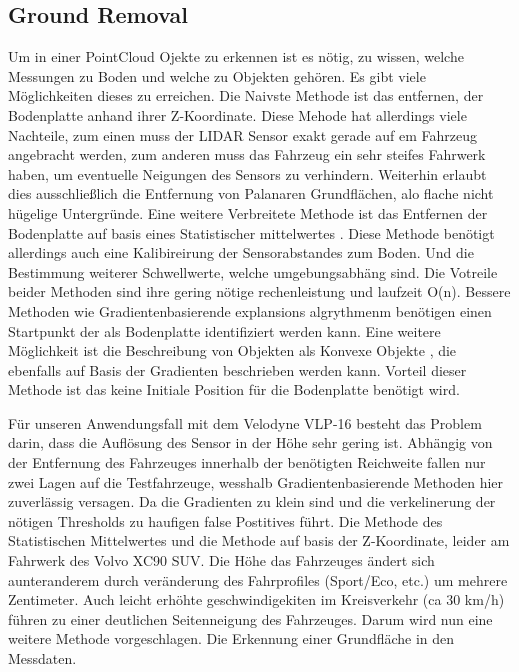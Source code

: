 \documentclass[11pt,oneside,openright]{mpreport}
\begin{document}
\subsection{Ground Removal}
Um in einer PointCloud Ojekte zu erkennen ist es nötig, zu wissen, welche Messungen zu Boden und welche zu Objekten gehören. Es gibt viele Möglichkeiten dieses
zu erreichen. Die Naivste Methode ist das entfernen, der Bodenplatte anhand ihrer Z-Koordinate. Diese Mehode hat allerdings viele Nachteile, zum einen muss
der LIDAR Sensor exakt gerade auf em Fahrzeug angebracht werden, zum anderen muss das Fahrzeug ein sehr steifes Fahrwerk haben, um eventuelle Neigungen des Sensors zu verhindern.
Weiterhin erlaubt dies ausschließlich die Entfernung von Palanaren Grundflächen, alo flache nicht hügelige Untergründe. Eine weitere Verbreitete Methode ist das 
Entfernen der Bodenplatte auf basis eines Statistischer mittelwertes \cite{Zhang}.  Diese Methode benötigt allerdings auch eine Kalibireirung der Sensorabstandes zum Boden.
Und die Bestimmung weiterer Schwellwerte, welche umgebungsabhäng sind. Die Votreile beider Methoden sind ihre gering nötige rechenleistung und laufzeit O(n).
Bessere Methoden wie Gradientenbasierende explansions algrythmenm benötigen einen Startpunkt der als Bodenplatte identifiziert werden kann.
Eine weitere Möglichkeit ist die Beschreibung von Objekten als Konvexe Objekte \cite{5164280}, die ebenfalls auf Basis der Gradienten beschrieben werden kann.
Vorteil dieser Methode ist das keine Initiale Position für die Bodenplatte benötigt wird.

Für unseren Anwendungsfall mit dem Velodyne VLP-16 besteht das Problem darin, dass die Auflösung des Sensor in der Höhe sehr gering ist. Abhängig von der Entfernung des 
Fahrzeuges innerhalb der benötigten Reichweite fallen nur zwei Lagen auf die Testfahrzeuge, wesshalb Gradientenbasierende Methoden hier zuverlässig versagen. Da die Gradienten zu klein sind und
die verkelinerung der nötigen Thresholds zu haufigen false Postitives führt. Die Methode des Statistischen Mittelwertes und die Methode auf basis der Z-Koordinate,
leider am Fahrwerk des Volvo XC90 SUV. Die Höhe das Fahrzeuges ändert sich aunteranderem durch veränderung des Fahrprofiles (Sport/Eco, etc.) um mehrere Zentimeter.
Auch leicht erhöhte geschwindigekiten im Kreisverkehr (ca 30 km/h) führen zu einer deutlichen Seitenneigung des Fahrzeuges. Darum wird nun eine weitere Methode vorgeschlagen.
Die Erkennung einer Grundfläche in den Messdaten. 
\end{document}
